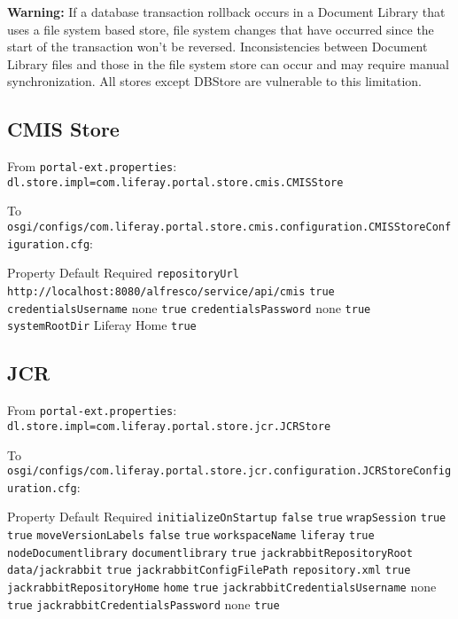 \textbf{Warning:} If a database transaction rollback occurs in a
Document Library that uses a file system based store, file system
changes that have occurred since the start of the transaction won't be
reversed. Inconsistencies between Document Library files and those in
the file system store can occur and may require manual synchronization.
All stores except DBStore are vulnerable to this limitation.

\noindent\hrulefill

\subsection{CMIS Store}\label{cmis-store}

From \texttt{portal-ext.properties}:
\texttt{dl.store.impl=com.liferay.portal.store.cmis.CMISStore}

To
\texttt{osgi/configs/com.liferay.portal.store.cmis.configuration.CMISStoreConfiguration.cfg}:

Property \textbar{} Default \textbar{} Required \texttt{repositoryUrl}
\textbar{} \texttt{http://localhost:8080/alfresco/service/api/cmis}
\textbar{} \texttt{true} \texttt{credentialsUsername} \textbar{} none
\textbar{} \texttt{true} \texttt{credentialsPassword} \textbar{} none
\textbar{} \texttt{true} \texttt{systemRootDir} \textbar{} Liferay Home
\textbar{} \texttt{true}

\subsection{JCR}\label{jcr}

From \texttt{portal-ext.properties}:
\texttt{dl.store.impl=com.liferay.portal.store.jcr.JCRStore}

To
\texttt{osgi/configs/com.liferay.portal.store.jcr.configuration.JCRStoreConfiguration.cfg}:

Property \textbar{} Default \textbar{} Required
\texttt{initializeOnStartup} \textbar{} \texttt{false}\textbar{}
\texttt{true} \texttt{wrapSession} \textbar{} \texttt{true} \textbar{}
\texttt{true} \texttt{moveVersionLabels} \textbar{} \texttt{false}
\textbar{} \texttt{true} \texttt{workspaceName} \textbar{}
\texttt{liferay} \textbar{} \texttt{true} \texttt{nodeDocumentlibrary}
\textbar{} \texttt{documentlibrary} \textbar{} \texttt{true}
\texttt{jackrabbitRepositoryRoot} \textbar{} \texttt{data/jackrabbit}
\textbar{} \texttt{true} \texttt{jackrabbitConfigFilePath} \textbar{}
\texttt{repository.xml} \textbar{} \texttt{true}
\texttt{jackrabbitRepositoryHome} \textbar{} \texttt{home} \textbar{}
\texttt{true} \texttt{jackrabbitCredentialsUsername} \textbar{} none
\textbar{} \texttt{true} \texttt{jackrabbitCredentialsPassword}
\textbar{} none \textbar{} \texttt{true}


